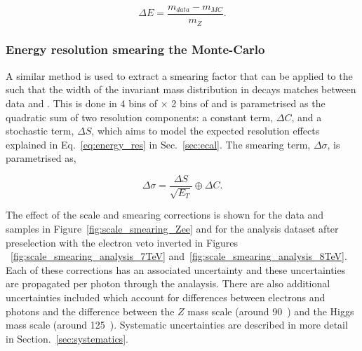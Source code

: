 \begin{equation}
  \Delta E = \frac{m_{data}-m_{MC}}{m_{Z}}.
\end{equation}

\subsubsection{Energy resolution smearing the Monte-Carlo}

A similar method is used to extract a smearing factor that can be applied to the \MC such that the width of the invariant mass distribution in \Zee decays matches between data and \MC. This is done in 4 bins of \eta $\times$ 2 bins of \rnine and is parametrised as the quadratic sum of two resolution components: a constant term, $\Delta C$, and a stochastic term, $\Delta S$, which aims to model the expected resolution effects explained in Eq.~\ref{eq:energy_res} in Sec.~\ref{sec:ecal}. The smearing term, $\Delta\sigma$, is parametrised as,

\begin{equation}
  \Delta\sigma = \frac{\Delta S}{\sqrt{E_{T}}} \oplus \Delta C.
\end{equation}

The effect of the scale and smearing corrections is shown for the \Zee data and \MC samples in Figure~\ref{fig:scale_smearing_Zee} and for the analysis dataset after preselection with the electron veto inverted in Figures ~\ref{fig:scale_smearing_analysis_7TeV} and~\ref{fig:scale_smearing_analysis_8TeV}. Each of these corrections has an associated uncertainty and these uncertainties are propagated per photon through the analaysis. There are also additional uncertainties included which account for differences between electrons and photons and the difference between the $Z$ mass scale (around 90~\GeV) and the Higgs mass scale (around 125~\GeV). Systematic uncertainties are described in more detail in Section.~\ref{sec:systematics}.

